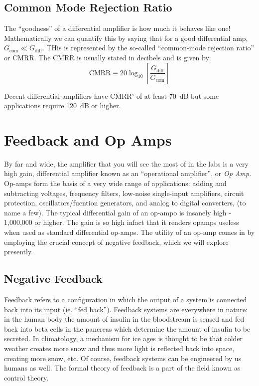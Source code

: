 \documentclass[]{article}
\begin{document}
\subsection{Common Mode Rejection Ratio}
The ``goodness'' of a differential amplifier is how much it behaves like one! Mathematically we can quantify this by saying that for a good differential amp, $G_\text{com} \ll G_\text{diff}$. THis is represented by the so-called ``common-mode rejection ratio'' or CMRR. The CMRR is usually stated in decibels and is given by:
\begin{equation}
\label{eq:def_CMRR}
\text{CMRR} \equiv 20\log_{10}\left[\frac{G_\text{diff}}{G_\text{com}}\right]
\end{equation}
 
Decent differential amplifiers have CMRR$^\text{s}$ of at least 70~dB but some applications require 120~dB or higher.

\section{Feedback and Op Amps}
By far and wide, the amplifier that you will see the most of in the labs is a very high gain, differential amplifier known as an ``operational amplifier'', or \textit{Op Amp}. Op-amps form the basis of a very wide range of applications: adding and subtracting voltages, frequency filters, low-noise single-input amplifiers, circuit protection, oscillators/fucntion generators, and analog to digital converters, (to name a few). The typical differential gain of an op-ampo is insanely high - 1,000,000 or higher. The gain is so high infact that it renders opamps useless when used as standard differential op-amps. The utility of an op-amp comes in by employing the crucial concept of negative feedback, which we will explore presently.

\subsection{Negative Feedback}
Feedback refers to a configuration in which the output of a system is connected back into its input (ie. ``fed back''). Feedback systems are everywhere in nature: in the human body the amount of insulin in the bloodstream is sensed and fed back into beta cells in the pancreas which determine the amount of insulin to be secreted. In climatology, a mechanism for ice ages is thought to be that colder weather creates more snow and thus more light is reflected back into space, creating more snow, etc. Of course, feedback systems can be engineered by us humans as well. The formal theory of feedback is a part of the field known as control theory.
\end{document}
